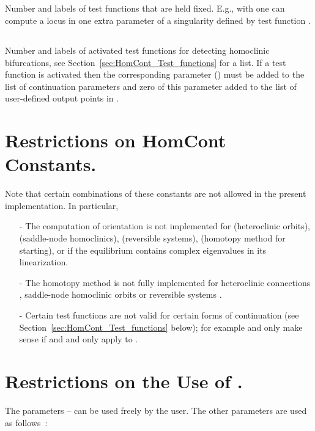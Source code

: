 \documentclass[12pt]{report}
\begin{document}
\subsection{}  \label{sec:IFIXED}
Number and labels of test functions that are held fixed. 
E.g., with  one can compute a locus in
one extra parameter of a singularity defined by 
test function .

\subsection{}  \label{sec:IPSI}
Number and labels of activated test functions for detecting homoclinic
bifurcations, see Section~\ref{sec:HomCont_Test_functions} 
for a list. If a test function is activated then the
corresponding parameter () 
must be added to the list of continuation parameters 
and zero of this parameter added to the list of user-defined
output points  in .

\section{ Restrictions on {\cal HomCont} Constants.}
Note that certain combinations of these constants are not allowed
in the present implementation. In particular,
\begin{itemize}
\item[-] 
The computation of orientation  is not
implemented for  (heteroclinic orbits), 
 (saddle-node homoclinics),
 (reversible systems),  (homotopy
method for starting), or if the equilibrium contains complex
eigenvalues in its linearization.  
\item[-] The homotopy method  is not fully implemented
for heteroclinic connections , saddle-node homoclinic
orbits  or reversible systems .
\item[-] Certain test functions are not valid for certain forms
of continuation 
(see Section~\ref{sec:HomCont_Test_functions} below); 
for example
 and  only make sense if 
 and  and  only apply
to .
\end{itemize}

\section{ Restrictions on the Use of .}
The parameters  --  can be used freely by
the user. The other parameters are used as follows~:
\end{document}
